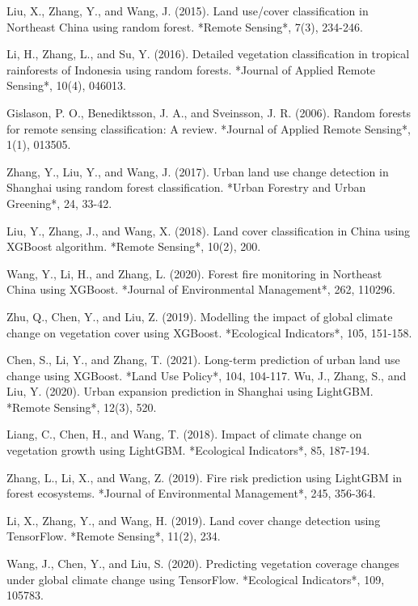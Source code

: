 \documentclass{article}
\begin{document}
\begin{thebibliography}{99}
Liu, X., Zhang, Y., and Wang, J. (2015). Land use/cover classification in Northeast China using random forest. *Remote Sensing*, 7(3), 234-246.

Li, H., Zhang, L., and Su, Y. (2016). Detailed vegetation classification in tropical rainforests of Indonesia using random forests. *Journal of Applied Remote Sensing*, 10(4), 046013.

Gislason, P. O., Benediktsson, J. A., and Sveinsson, J. R. (2006). Random forests for remote sensing classification: A review. *Journal of Applied Remote Sensing*, 1(1), 013505.

Zhang, Y., Liu, Y., and Wang, J. (2017). Urban land use change detection in Shanghai using random forest classification. *Urban Forestry and Urban Greening*, 24, 33-42.

Liu, Y., Zhang, J., and Wang, X. (2018). Land cover classification in China using XGBoost algorithm. *Remote Sensing*, 10(2), 200.

Wang, Y., Li, H., and Zhang, L. (2020). Forest fire monitoring in Northeast China using XGBoost. *Journal of Environmental Management*, 262, 110296.

Zhu, Q., Chen, Y., and Liu, Z. (2019). Modelling the impact of global climate change on vegetation cover using XGBoost. *Ecological Indicators*, 105, 151-158.

Chen, S., Li, Y., and Zhang, T. (2021). Long-term prediction of urban land use change using XGBoost. *Land Use Policy*, 104, 104-117.
Wu, J., Zhang, S., and Liu, Y. (2020). Urban expansion prediction in Shanghai using LightGBM. *Remote Sensing*, 12(3), 520.

Liang, C., Chen, H., and Wang, T. (2018). Impact of climate change on vegetation growth using LightGBM. *Ecological Indicators*, 85, 187-194.

Zhang, L., Li, X., and Wang, Z. (2019). Fire risk prediction using LightGBM in forest ecosystems. *Journal of Environmental Management*, 245, 356-364.

	
Li, X., Zhang, Y., and Wang, H. (2019). Land cover change detection using TensorFlow. *Remote Sensing*, 11(2), 234.

Wang, J., Chen, Y., and Liu, S. (2020). Predicting vegetation coverage changes under global climate change using TensorFlow. *Ecological Indicators*, 109, 105783.


\end{thebibliography}
\end{document}
